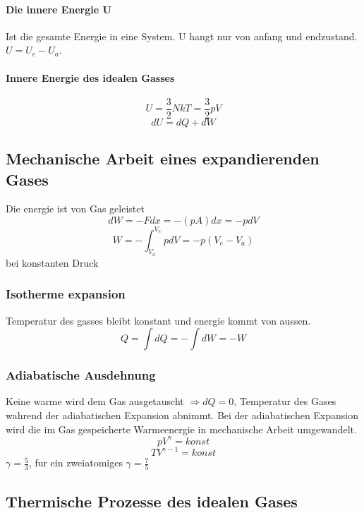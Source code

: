 \documentclass[7pt]{article}
\begin{document}
\begin{multicols*}{3}
\paragraph{Die innere Energie U}
Ist die gesamte Energie in eine System. U hangt nur von anfang und endzustand. $U = U_e-U_a$.
\paragraph{Innere Energie des idealen Gasses}
\begin{equation}
	U=\frac{3}{2}NkT=\frac{3}{2}pV
\end{equation}
\begin{equation}
	dU=dQ+dW
\end{equation}

\subsection{Mechanische Arbeit eines expandierenden Gases}
Die energie ist von Gas geleistet
\begin{equation}
	dW=-Fdx=-(pA)dx=-pdV
\end{equation}
\begin{equation}
	W=-\int^{V_e}_{V_a}pdV=-p(V_e-V_a)
\end{equation}
bei konstanten Druck
\subsubsection{Isotherme expansion}
Temperatur des gasses bleibt konstant und energie kommt von aussen.
\begin{equation}
	Q=\int dQ=-\int dW=-W
\end{equation}
\subsubsection{Adiabatische Ausdehnung}
Keine warme wird dem Gas ausgetauscht $\Rightarrow dQ=0$, Temperatur des Gases wahrend der adiabatischen Expansion abnimmt. Bei der adiabatischen Expansion wird die im Gas gespeicherte Warmeenergie in mechanische Arbeit umgewandelt.
\begin{equation}
	pV^\gamma=konst
\end{equation}
\begin{equation}
	TV^{\gamma -1 }=konst
\end{equation}
$\gamma=\frac{5}{3}$, fur ein zweiatomiges $\gamma=\frac{7}{5}$

\subsection{Thermische Prozesse des idealen Gases}


\end{multicols*}
\end{document}
